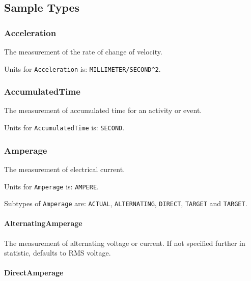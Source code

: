 \subsection{Sample Types} \label{sec:Sample Types}

\subsubsection{Acceleration}
\label{sec:Acceleration}



The measurement of the rate of change of velocity.


Units for \texttt{Acceleration} is: \texttt{MILLIMETER/SECOND\^{}2}.

\FloatBarrier

\subsubsection{AccumulatedTime}
\label{sec:AccumulatedTime}



The measurement of accumulated time for an activity or event.


Units for \texttt{AccumulatedTime} is: \texttt{SECOND}.

\FloatBarrier

\subsubsection{Amperage}
\label{sec:Amperage}



The measurement of electrical current.


Units for \texttt{Amperage} is: \texttt{AMPERE}.


Subtypes of \texttt{Amperage} are: \texttt{ACTUAL}, \texttt{ALTERNATING}, \texttt{DIRECT}, \texttt{TARGET} and \texttt{TARGET}. 
\FloatBarrier

\paragraph{AlternatingAmperage}\mbox{}
\label{sec:AlternatingAmperage}



The measurement of alternating voltage or current.   If not specified further in statistic, defaults to RMS voltage. 


\paragraph{DirectAmperage}\mbox{}
\label{sec:DirectAmperage}



